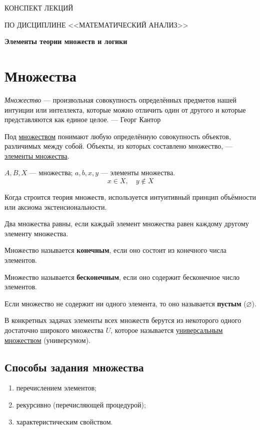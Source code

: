 \documentclass[a4paper, 12pt]{article}
\begin{document}
\begin{center}
{\large КОНСПЕКТ ЛЕКЦИЙ}

ПО ДИСЦИПЛИНЕ <<МАТЕМАТИЧЕСКИЙ АНАЛИЗ>>


\tableofcontents
\label{contents}

\pagebreak

\vspace{5pt}
\textbf{Элементы теории множеств и логики}
\end{center}
\vspace{10pt}

\section{Множества}

\emph{Множество} --- произвольная совокупность определённых предметов нашей
интуиции или интеллекта, которые можно отличить один от другого и которые
представляются как единое целое.
\hfill --- Георг Кантор

Под \underline{множеством} понимают любую определённую совокупность объектов,
различимых между собой. Объекты, из которых составлено множество, ---
\underline{элементы множества}.

$A, B, X$ --- множества; \quad $a, b, x, y$ --- элементы множества.
\[
  \boxed{x \in X, \quad y \notin X}
\]

Когда строится теория множеств, используется интуитивный принцип объёмности
или аксиома экстенсиональности.

Два множества равны, если каждый элемент множества равен каждому другому
элементу множества.

Множество называется \textbf{конечным}, если оно состоит из конечного числа
элементов.

Множество называется \textbf{бесконечным}, если оно содержит бесконечное число
элементов.

Если множество не содержит ни одного элемента, то оно называется
\textbf{пустым} ($\varnothing$).

В конкретных задачах элементы всех множеств берутся из некоторого одного
достаточно широкого множества $U$, которое называется
\underline{универсальным} \underline{множеством} (универсумом).

\subsection{Способы задания множества}

\begin{enumerate}[noitemsep]
  \item перечислением элементов;
  \item рекурсивно (перечисляющей процедурой);
  \item характеристическим свойством.
\end{enumerate}
\end{document}
